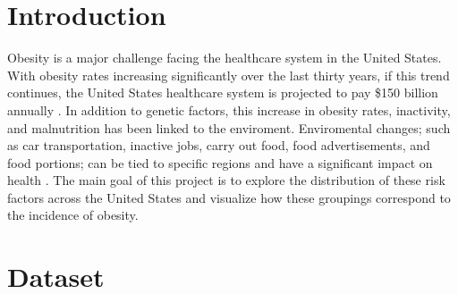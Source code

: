 \documentclass{article}
\begin{document}
 



\section{Introduction}
\label{introduction}

Obesity is a major challenge facing the healthcare system in the United States. With obesity rates increasing significantly over the last thirty years, if this trend continues, the United States healthcare system is projected to pay \$150 billion annually \cite{hurt2010obesity}.
In addition to genetic factors, this increase in obesity rates, inactivity, and malnutrition has been linked to the enviroment. 
Enviromental changes; such as car transportation, inactive jobs, carry out food, food advertisements, and food portions; can be tied to specific regions and have a significant impact on health \cite{whyobesityhealthproblem, understandingadultoverweight}. 
The main goal of this project is to explore the distribution of these risk factors across the United States and visualize how these groupings correspond to the incidence of obesity.

\section{Dataset}
\label{dataset}
\end{document}
